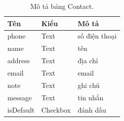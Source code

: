 \documentclass[11pt]{report}
\begin{document}
	
	\begin{table}[h!]
		\begin{center}
			\caption{Mô tả bảng Contact.}
			\begin{tabular}{ |l|l|l| } 
				\hline
				Tên & Kiểu & Mô tả \\
				\hline
				phone & Text & số điện thoại \\
				name & Text & tên \\
				address & Text & địa chỉ \\
				email & Text & email \\
				note & Text & ghi chú \\
				message & Text & tin nhắn \\
				isDefault & Checkbox & đánh dấu \\ 
				\hline
			\end{tabular}
			\label{table:Contact}
		\end{center}
	\end{table}
	
\end{document}
